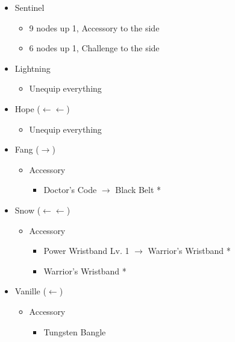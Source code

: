 \begin{menu}
\begin{multicols}{2}
\begin{itemize}
\begin{itemize}
\begin{itemize}
            \item Sentinel
            \begin{itemize}
                \item 9 nodes up 1, Accessory to the side
                \item 6 nodes up 1, Challenge to the side
            \end{itemize}
        \end{itemize}
    \end{itemize}
    \columnbreak
    \equip
    \begin{itemize}
        \item Lightning
        \begin{itemize}
            \item Unequip everything
        \end{itemize}
        \item Hope ($\leftarrow\leftarrow$)
        \begin{itemize}
            \item Unequip everything
        \end{itemize}
        \item Fang ($\rightarrow$)
        \begin{itemize}
            \item Accessory
            \begin{itemize}
                \item Doctor's Code $\rightarrow$ Black Belt *
            \end{itemize}
        \end{itemize}
        \item Snow ($\leftarrow\leftarrow$)
        \begin{itemize}
            \item Accessory
            \begin{itemize}
                \item Power Wristband Lv. 1 $\rightarrow$ Warrior's Wristband *
                \item Warrior's Wristband *
            \end{itemize}
        \end{itemize}
        \item Vanille ($\leftarrow$)
        \begin{itemize}
            \item Accessory
            \begin{itemize}
                \item Tungsten Bangle

\end{itemize}
\end{itemize}
\end{itemize}
\end{itemize}
\end{multicols}
\end{menu}
